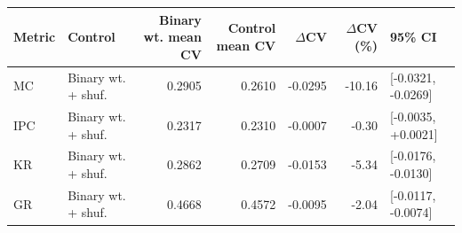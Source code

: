 \begin{tabular}{llrrrrl}
\toprule
Metric & Control & Binary wt. mean CV & Control mean CV & $\Delta$CV & $\Delta$CV (\%) & 95\% CI \\
\midrule
MC & Binary wt. + shuf. & 0.2905 & 0.2610 & -0.0295 & -10.16 & [-0.0321, -0.0269] \\
IPC & Binary wt. + shuf. & 0.2317 & 0.2310 & -0.0007 & -0.30 & [-0.0035, +0.0021] \\
KR & Binary wt. + shuf. & 0.2862 & 0.2709 & -0.0153 & -5.34 & [-0.0176, -0.0130] \\
GR & Binary wt. + shuf. & 0.4668 & 0.4572 & -0.0095 & -2.04 & [-0.0117, -0.0074] \\
\bottomrule
\end{tabular}
